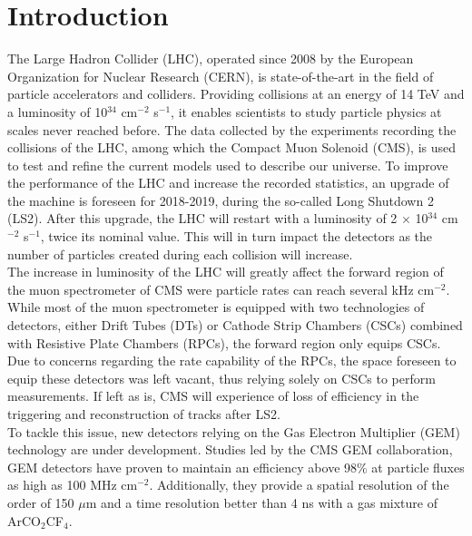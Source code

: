\chapter*{Introduction}
\label{chap:0-4-introduction}

  The Large Hadron Collider (LHC), operated since 2008 by the European Organization for Nuclear Research (CERN), is state-of-the-art in the field of particle accelerators and colliders. Providing collisions at an energy of 14 TeV and a luminosity of 10$^{34}$ cm$^{-2}$ s$^{-1}$, it enables scientists to study particle physics at scales never reached before. The data collected by the experiments recording the collisions of the LHC, among which the Compact Muon Solenoid (CMS), is used to test and refine the current models used to describe our universe. To improve the performance of the LHC and increase the recorded statistics, an upgrade of the machine is foreseen for 2018-2019, during the so-called Long Shutdown 2 (LS2). After this upgrade, the LHC will restart with a luminosity of 2 $\times$ 10$^{34}$ cm$^{-2}$ s$^{-1}$, twice its nominal value. This will in turn impact the detectors as the number of particles created during each collision will increase. \\

  The increase in luminosity of the LHC will greatly affect the forward region of the muon spectrometer of CMS were particle rates can reach several kHz cm$^{-2}$. While most of the muon  spectrometer is equipped with two technologies of detectors, either Drift Tubes (DTs) or Cathode Strip Chambers (CSCs) combined with Resistive Plate Chambers (RPCs), the forward region only equips CSCs. Due to concerns regarding the rate capability of the RPCs, the space foreseen to equip these detectors was left vacant, thus relying solely on CSCs to perform measurements. If left as is, CMS will experience of loss of efficiency in the triggering and reconstruction of tracks after LS2. \\

  To tackle this issue, new detectors relying on the Gas Electron Multiplier (GEM) technology are under development. Studies led by the CMS GEM collaboration, GEM detectors have proven to maintain an efficiency above 98\% at particle fluxes as high as 100 MHz cm$^{-2}$. Additionally, they provide a spatial resolution of the order of 150 $\mu$m and a time resolution better than 4 ns with a gas mixture of ArCO$_2$CF$_4$.
